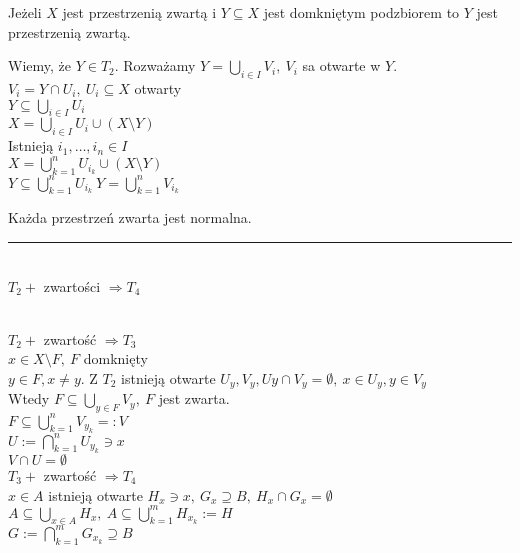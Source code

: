 \begin{lem} 
    Jeżeli $X$ jest przestrzenią zwartą i $Y \subseteq X$ jest domkniętym podzbiorem to 
    $Y$ jest przestrzenią zwartą. 
    \begin{dd} 
        Wiemy, że $Y \in T_2$. Rozważamy $Y = \bigcup\limits_{i \in I} V_i,\ V_i$ sa
        otwarte w $Y$. \\ 
        $V_i = Y \cap U_i,\ U_i \subseteq X$ otwarty \\ 
        $Y \subseteq \bigcup\limits_{i \in I} U_i$ \\ 
        $X = \bigcup\limits_{i \in I} U_i \cup (X \setminus Y)$ \\ 
        Istnieją $i_1,\ldots,i_n \in I$ \\ 
        $X = \bigcup\limits_{k = 1}^n U_{i_k} \cup (X \setminus Y)$ \\ 
        $Y \subseteq \bigcup\limits_{k=1}^n U_{i_k} \ Y = \bigcup\limits_{k=1}^n V_{i_k}$
    \end{dd} 
\end{lem} 
\begin{tw} 
    Każda przestrzeń zwarta jest normalna. \\ 
    \rule{2cm}{0.4pt} \\
    \footnotesize{$T_2 + $ zwartości $\Rightarrow T_4$}
\end{tw} 
\begin{dd} ~\\ 
    $T_2 +$ zwartość $\Rightarrow T_3$ \\ 
    $x \in X \setminus F,\ F$ domknięty \\
    $y \in F, x \neq y$. Z $T_2$ istnieją otwarte $U_y, V_y, Uy
    \cap V_y = \emptyset,\ x \in U_y, y \in V_y$ \\ 
    Wtedy $F \subseteq \bigcup\limits_{y \in F} V_y,\ F$ jest zwarta. \\ 
    $F \subseteq \bigcup\limits_{k=1}^n V_{y_k} =: V$ \\ 
    $U := \bigcap\limits_{k=1}^n U_{y_k} \ni x$ \\
    $V \cap U = \emptyset$ \\ 
    $T_3 +$ zwartość $\Rightarrow T_4$ \\ 
    $x \in A$ istnieją otwarte $H_x \ni x,\ G_x \supseteq B,\ H_x \cap G_x = \emptyset$ \\
    $A \subseteq \bigcup\limits_{x \in A} H_x, \ A \subseteq \bigcup\limits_{k=1}^m
    H_{x_k} := H$ \\ 
    $G := \bigcap\limits_{k=1}^m G_{x_k} \supseteq B$
\end{dd} 
